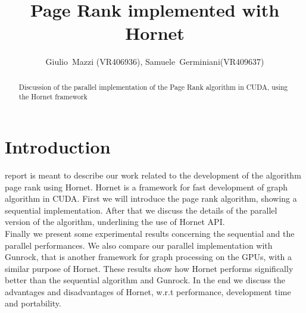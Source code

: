 \documentclass[journal]{IEEEtran}
\begin{document}
\title{Page Rank implemented with Hornet}
\author{Giulio~Mazzi (VR406936), Samuele~Germiniani(VR409637)}

\markboth{}%
{}
\maketitle

\begin{abstract}
Discussion of the parallel implementation of the Page Rank algorithm 
in CUDA, using the Hornet framework
\end{abstract}

\section{Introduction}
report is meant to describe our work related to the development of the 
algorithm page rank using Hornet. Hornet is a framework for fast development
of graph algorithm in CUDA.
First we will introduce the page rank algorithm, showing a sequential 
implementation. After that we discuss the details of the parallel version
of the algorithm, underlining the use of Hornet API.\\
Finally we present some experimental results concerning the sequential and
the parallel performances. We also compare our parallel implementation with
Gunrock, that is another framework for graph processing on the GPUs, with a
similar purpose of Hornet.
These results show how Hornet performs significally better than the sequential
algorithm and Gunrock.
In the end we discuss the advantages and disadvantages of Hornet, w.r.t 
performance, development time and portability.
\end{document}
